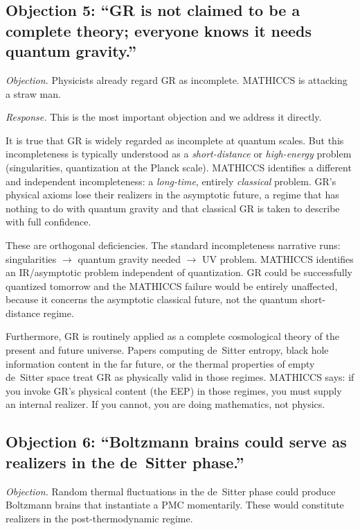 \documentclass[11pt,a4paper]{article}
\begin{document}
\subsection{Objection 5: ``GR is not claimed to be a complete theory; everyone knows it needs quantum gravity.''}

\emph{Objection.} Physicists already regard GR as incomplete. MATHICCS is attacking a
straw man.

\emph{Response.} This is the most important objection and we address it directly.

It is true that GR is widely regarded as incomplete at quantum scales. But this
incompleteness is typically understood as a \emph{short-distance} or
\emph{high-energy} problem (singularities, quantization at the Planck scale).
MATHICCS identifies a different and independent incompleteness: a \emph{long-time},
entirely \emph{classical} problem. GR's physical axioms lose their realizers in the
asymptotic future, a regime that has nothing to do with quantum gravity and that
classical GR is taken to describe with full confidence.

These are orthogonal deficiencies. The standard incompleteness narrative runs:
singularities $\to$ quantum gravity needed $\to$ UV problem. MATHICCS identifies an
IR/asymptotic problem independent of quantization. GR could be successfully quantized
tomorrow and the MATHICCS failure would be entirely unaffected, because it concerns
the asymptotic classical future, not the quantum short-distance regime.

Furthermore, GR is routinely applied as a complete cosmological theory of the present
and future universe. Papers computing de~Sitter entropy, black hole information content
in the far future, or the thermal properties of empty de~Sitter space treat GR as
physically valid in those regimes. MATHICCS says: if you invoke GR's physical content
(the EEP) in those regimes, you must supply an internal realizer. If you cannot, you
are doing mathematics, not physics.

\subsection{Objection 6: ``Boltzmann brains could serve as realizers in the de~Sitter phase.''}

\emph{Objection.} Random thermal fluctuations in the de~Sitter phase could produce
Boltzmann brains that instantiate a PMC momentarily. These would constitute realizers
in the post-thermodynamic regime.
\end{document}
